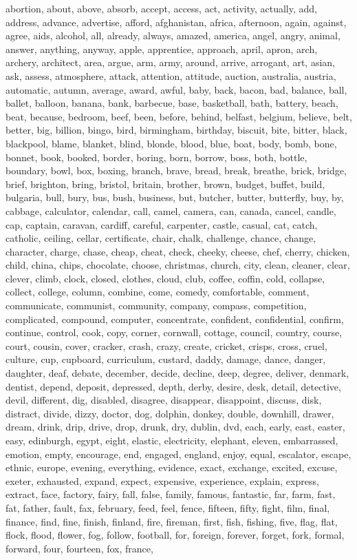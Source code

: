 \small
\noindent abortion, about, above, absorb, accept, access, act, activity, actually, add, address, advance, advertise, afford, afghanistan, africa, afternoon, again, against, agree, aids, alcohol, all, already, always, amazed, america, angel, angry, animal, answer, anything, anyway, apple, apprentice, approach, april, apron, arch, archery, architect, area, argue, arm, army, around, arrive, arrogant, art, asian, ask, assess, atmosphere, attack, attention, attitude, auction, australia, austria, automatic, autumn, average, award, awful, baby, back, bacon, bad, balance, ball, ballet, balloon, banana, bank, barbecue, base, basketball, bath, battery, beach, beat, because, bedroom, beef, been, before, behind, belfast, belgium, believe, belt, better, big, billion, bingo, bird, birmingham, birthday, biscuit, bite, bitter, black, blackpool, blame, blanket, blind, blonde, blood, blue, boat, body, bomb, bone, bonnet, book, booked, border, boring, born, borrow, boss, both, bottle, boundary, bowl, box, boxing, branch, brave, bread, break, breathe, brick, bridge, brief, brighton, bring, bristol, britain, brother, brown, budget, buffet, build, bulgaria, bull, bury, bus, bush, business, but, butcher, butter, butterfly, buy, by, cabbage, calculator, calendar, call, camel, camera, can, canada, cancel, candle, cap, captain, caravan, cardiff, careful, carpenter, castle, casual, cat, catch, catholic, ceiling, cellar, certificate, chair, chalk, challenge, chance, change, character, charge, chase, cheap, cheat, check, cheeky, cheese, chef, cherry, chicken, child, china, chips, chocolate, choose, christmas, church, city, clean, cleaner, clear, clever, climb, clock, closed, clothes, cloud, club, coffee, coffin, cold, collapse, collect, college, column, combine, come, comedy, comfortable, comment, communicate, communist, community, company, compass, competition, complicated, compound, computer, concentrate, confident, confidential, confirm, continue, control, cook, copy, corner, cornwall, cottage, council, country, course, court, cousin, cover, cracker, crash, crazy, create, cricket, crisps, cross, cruel, culture, cup, cupboard, curriculum, custard, daddy, damage, dance, danger, daughter, deaf, debate, december, decide, decline, deep, degree, deliver, denmark, dentist, depend, deposit, depressed, depth, derby, desire, desk, detail, detective, devil, different, dig, disabled, disagree, disappear, disappoint, discuss, disk, distract, divide, dizzy, doctor, dog, dolphin, donkey, double, downhill, drawer, dream, drink, drip, drive, drop, drunk, dry, dublin, dvd, each, early, east, easter, easy, edinburgh, egypt, eight, elastic, electricity, elephant, eleven, embarrassed, emotion, empty, encourage, end, engaged, england, enjoy, equal, escalator, escape, ethnic, europe, evening, everything, evidence, exact, exchange, excited, excuse, exeter, exhausted, expand, expect, expensive, experience, explain, express, extract, face, factory, fairy, fall, false, family, famous, fantastic, far, farm, fast, fat, father, fault, fax, february, feed, feel, fence, fifteen, fifty, fight, film, final, finance, find, fine, finish, finland, fire, fireman, first, fish, fishing, five, flag, flat, flock, flood, flower, fog, follow, football, for, foreign, forever, forget, fork, formal, forward, four, fourteen, fox, france, 